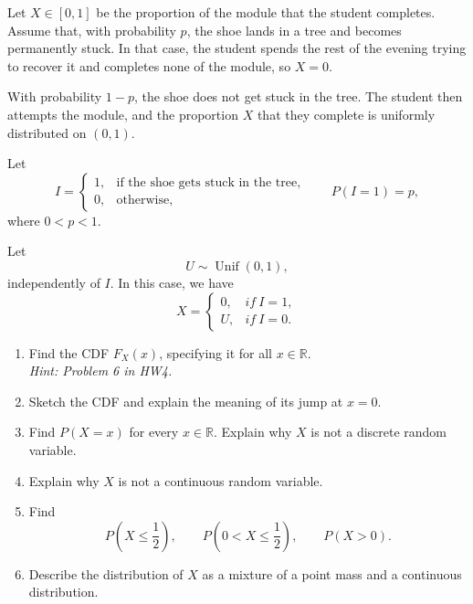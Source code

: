 \documentclass[11pt]{article}
\begin{document}
Let $X\in[0,1]$ be the proportion of the module that the student completes.
Assume that, with probability \(p\), the shoe lands in a tree and becomes
permanently stuck. In that case, the student spends the rest of the evening
trying to recover it and completes none of the module, so \(X=0\).

With probability \(1-p\), the shoe does not get stuck in the tree. The student
then attempts the module, and the proportion \(X\) that they complete is
uniformly distributed on \((0,1)\).

Let
\[
I=
\begin{cases}
1, & \text{if the shoe gets stuck in the tree},\\
0, & \text{otherwise},
\end{cases}
\qquad
P(I=1)=p,
\]
where \(0<p<1\).

Let
\[
U\sim\operatorname{Unif}(0,1),
\]
independently of \(I\). In this case, we have
\[
X=
\begin{cases}
0, & if \ I=1,\\
U, & if \ I=0.
\end{cases}
\]

\begin{enumerate}[label=(\alph*), leftmargin=*]
    \item Find the CDF \(F_X(x)\), specifying it for all \(x\in\mathbb R\).\\
    \textit{Hint: Problem 6 in HW4.}

    \item Sketch the CDF and explain the meaning of its jump at \(x=0\).

    \item Find \(P(X=x)\) for every \(x\in\mathbb R\). Explain why \(X\) is not
    a discrete random variable.

    \item Explain why \(X\) is not a continuous random variable.

    \item Find
    \[
    P\left(X\leq\frac12\right),
    \qquad
    P\left(0<X\leq\frac12\right),
    \qquad
    P(X>0).
    \]

    \item Describe the distribution of \(X\) as a mixture of a point mass and a
    continuous distribution.
\end{enumerate}
\end{document}
